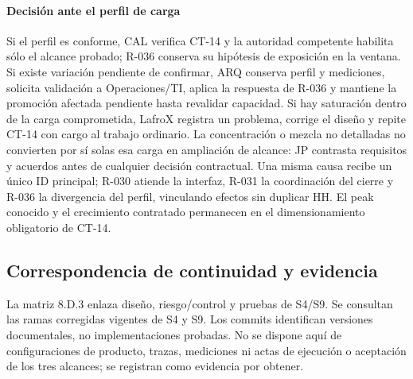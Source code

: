 \documentclass[carta,firma,sinnotas]{lafrox}
\begin{document}
\paragraph{Decisión ante el perfil de carga}
Si el perfil es conforme, CAL verifica CT-14 y la autoridad competente habilita
sólo el alcance probado; R-036 conserva su hipótesis de exposición en la ventana.
Si existe variación pendiente de confirmar, ARQ conserva perfil y mediciones,
solicita validación a Operaciones/TI, aplica la respuesta de R-036 y mantiene
la promoción afectada pendiente hasta revalidar capacidad.
Si hay saturación dentro de la carga comprometida, LafroX registra un problema,
corrige el diseño y repite CT-14 con cargo al trabajo ordinario. La concentración
o mezcla no detalladas no convierten por sí solas esa carga en ampliación de
alcance: JP contrasta requisitos y acuerdos antes de cualquier decisión contractual.
Una misma causa recibe un único ID principal; R-030 atiende la interfaz,
R-031 la coordinación del cierre y R-036 la divergencia del perfil, vinculando
efectos sin duplicar HH. El peak conocido y el crecimiento contratado permanecen
en el dimensionamiento obligatorio de CT-14.


\clearpage
\subsection*{Correspondencia de continuidad y evidencia}
La matriz 8.D.3 enlaza diseño, riesgo/control y pruebas de S4/S9. Se consultan
las ramas corregidas vigentes de S4 y S9.
Los commits identifican versiones documentales, no implementaciones probadas.
No se dispone aquí de configuraciones de producto, trazas, mediciones ni actas
de ejecución o aceptación de los tres alcances; se registran como evidencia por obtener.
\end{document}
